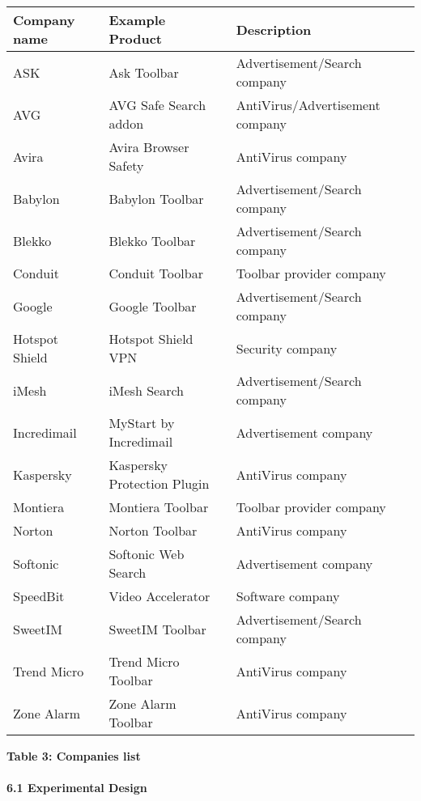 \documentclass{article} %
\begin{document}
\begin{tabular}{|p{0.7in}|p{1.8in}|p{1.9in}|} \hline 
\textbf{Company name}  &  \textbf{ Example Product}  &  \textbf{ Description}  \\ \hline 
ASK  &  Ask Toolbar  & Advertisement/Search company  \\ \hline 
AVG  &  AVG Safe Search addon  & AntiVirus/Advertisement company  \\ \hline 
Avira  &  Avira Browser Safety  & AntiVirus company  \\ \hline 
Babylon  &  Babylon Toolbar  & Advertisement/Search company  \\ \hline 
Blekko  &  Blekko Toolbar  & Advertisement/Search company  \\ \hline 
Conduit  &  Conduit Toolbar  & Toolbar provider company  \\ \hline 
Google  &  Google Toolbar  & Advertisement/Search company  \\ \hline 
Hotspot Shield  &  Hotspot Shield VPN  & Security company  \\ \hline 
iMesh  &  iMesh Search  & Advertisement/Search company  \\ \hline 
Incredimail  &  MyStart by Incredimail  & Advertisement company  \\ \hline 
Kaspersky  &  Kaspersky Protection Plugin  & AntiVirus company  \\ \hline 
Montiera  &  Montiera Toolbar  & Toolbar provider company  \\ \hline 
Norton  &  Norton Toolbar  & AntiVirus company  \\ \hline 
Softonic  &  Softonic Web Search  & Advertisement company  \\ \hline 
SpeedBit  &  Video Accelerator  & Software company  \\ \hline 
SweetIM  &  SweetIM Toolbar  & Advertisement/Search company  \\ \hline 
Trend Micro  &  Trend Micro Toolbar  & AntiVirus company  \\ \hline 
Zone Alarm  &  Zone Alarm Toolbar  & AntiVirus company  \\ \hline 
\end{tabular}

\textbf{Table 3: Companies list}

\noindent 




\paragraph{6.1  Experimental Design}
\end{document}

